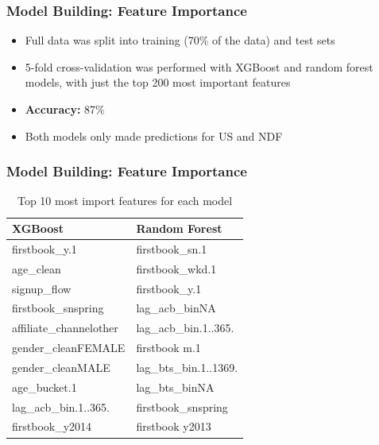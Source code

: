 \documentclass{beamer}
\begin{document}

\begin{frame}
\frametitle{Model Building: Feature Importance}
\begin{itemize}
  \item Full data was split into training (70\% of the data) and test sets
  \item 5-fold cross-validation was performed with XGBoost and random forest models, with just the top 200 most important features
  \item \textbf{Accuracy:} 87\%
  \item Both models only made predictions for US and NDF
\end{itemize}
\end{frame}


\begin{frame}
\frametitle{Model Building: Feature Importance}
\begin{table}[ht]
\centering
\begin{tabular}{| l | l |}
  \hline
  \textbf{XGBoost} & \textbf{Random Forest} \\ 
  \hline
  firstbook\_y.1 & firstbook\_sn.1 \\
  age\_clean & firstbook\_wkd.1 \\
  signup\_flow & firstbook\_y.1 \\
  firstbook\_snspring & lag\_acb\_binNA \\
  affiliate\_channelother & lag\_acb\_bin.1..365. \\
  gender\_cleanFEMALE & firstbook m.1 \\
  gender\_cleanMALE & lag\_bts\_bin.1..1369. \\
  age\_bucket.1 & lag\_bts\_binNA \\
  lag\_acb\_bin.1..365. & firstbook\_snspring \\
  firstbook\_y2014 & firstbook y2013 \\
  \hline
\end{tabular}
\caption{Top 10 most import features for each model}
\end{table}
\end{frame}

\end{document}
